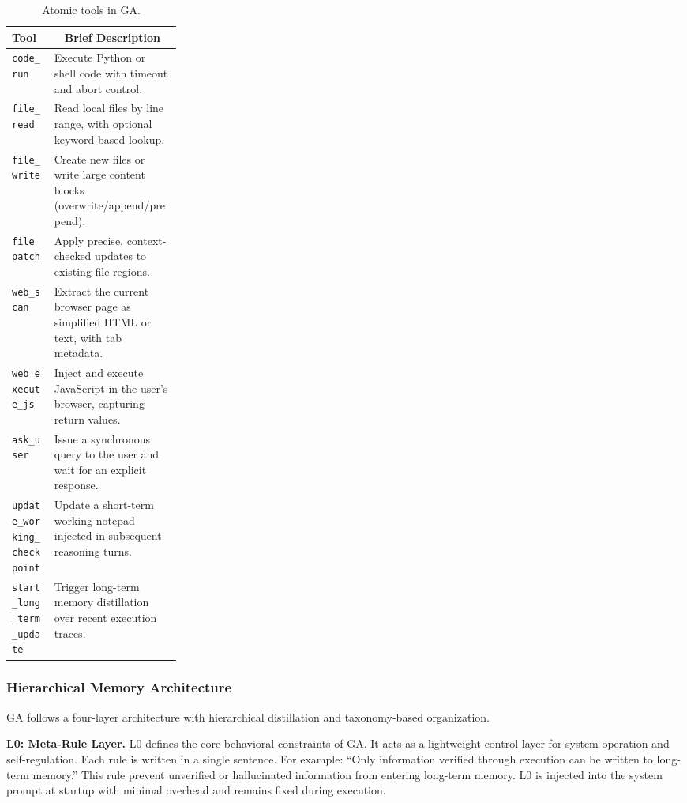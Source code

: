 \begin{table}[t]
    \centering
    \caption{Atomic tools in GA.}
    \label{tab:tools}
    {\footnotesize
    \setlength{\tabcolsep}{1.2pt}
    \renewcommand{\arraystretch}{0.95}
    \begin{tabularx}{\linewidth}{@{}p{0.25\linewidth}@{\hspace{4pt}}X@{}}
    \toprule
    \rowcolor{blue!8}
    \textbf{Tool} & \multicolumn{1}{c}{\textbf{Brief Description}} \\
    \midrule
    \mbox{\texttt{code\_run}} &
    Execute Python or shell code with timeout and abort control. \\
    \mbox{\texttt{file\_read}} &
    Read local files by line range, with optional keyword-based lookup. \\
    \mbox{\texttt{file\_write}} &
    Create new files or write large content blocks (overwrite/append/prepend). \\
    \mbox{\texttt{file\_patch}} &
    Apply precise, context-checked updates to existing file regions. \\
    \mbox{\texttt{web\_scan}} &
    Extract the current browser page as simplified HTML or text, with tab metadata. \\
    \mbox{\texttt{web\_execute\_js}} &
    Inject and execute JavaScript in the user’s browser, capturing return values. \\
    \mbox{\texttt{ask\_user}} &
    Issue a synchronous query to the user and wait for an explicit response. \\
    \mbox{\texttt{update\_working\_checkpoint}} &
    Update a short-term working notepad injected in subsequent reasoning turns. \\
    \mbox{\texttt{start\_long\_term\_update}} &
    Trigger long-term memory distillation over recent execution traces. \\
    \bottomrule
    \end{tabularx}
    }
\end{table}

\subsubsection{Hierarchical Memory Architecture}
\label{sec:momory}
GA follows a four-layer architecture with hierarchical distillation and taxonomy-based organization.

\textbf{L0: Meta-Rule Layer.}  L0 defines the core behavioral constraints of GA. It acts as a lightweight control layer for system operation and self-regulation. Each rule is written in a single sentence. For example: ``Only information verified through execution can be written to long-term memory.'' This rule prevent unverified or hallucinated information from entering long-term memory. L0 is injected into the system prompt at startup with minimal overhead and remains fixed during execution.

